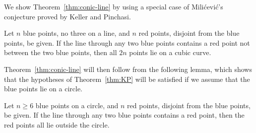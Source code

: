 \documentclass[a4paper,11pt,leqno]{article}
\newcommand{\sujoy}[1]{\textcolor{purple}{Sujoy says: #1}}
\begin{document}
We show Theorem~\ref{thm:conic-line} by using a special case of Mili\'cevi\'c's conjecture proved by Keller and Pinchasi.
\begin{theorem}\label{thm:KP}
Let $n$ blue points, no three on a line, and $n$ red points, disjoint from the blue points, be given.
If the line through any two blue points contains a red point not between the two blue points, then all $2n$ points lie on a cubic curve.
\end{theorem}

Theorem~\ref{thm:conic-line} will then follow from the following lemma, which shows that the hypotheses of Theorem~\ref{thm:KP} will be satisfied if we assume that the blue points lie on a circle.

\begin{lemma}\label{lemma:3}
Let $n\geq 6$ blue points on a circle, and $n$ red points, disjoint from the blue points, be given.
If the line through any two blue points contains a red point, then the red points all lie outside the circle.
\end{lemma}
\end{document}
